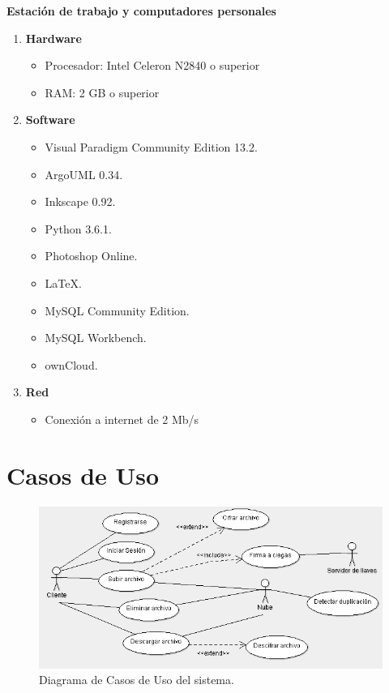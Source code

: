 \textbf{Estación de trabajo y computadores personales}
\begin{enumerate}
\item \textbf{Hardware}
\begin{itemize}
\item Procesador: Intel Celeron N2840 o superior
\item RAM: 2 GB o superior
\end{itemize}
\item \textbf{Software}
\begin{itemize}
\item Visual Paradigm Community Edition 13.2.
\item ArgoUML 0.34.
\item Inkscape 0.92.
\item Python 3.6.1.
\item Photoshop Online.
\item LaTeX.
\item MySQL Community Edition.
\item MySQL Workbench.
\item ownCloud.
\end{itemize}

\item \textbf{Red}
\begin{itemize}
\item Conexión a internet de 2 Mb/s
\end{itemize}

\end{enumerate}



\newpage
\section{Casos de Uso}

\begin{figure}[htbp!]
		\centering
			\includegraphics[width=1\textwidth]{images/CasosDeUso}
		\caption{Diagrama de Casos de Uso del sistema.}
	\end{figure}

